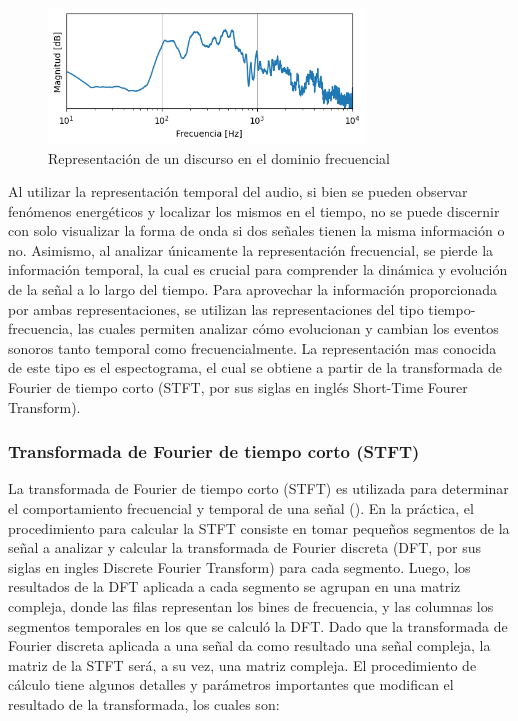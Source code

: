 \begin{figure}[h]
    \centering
    \includegraphics[width=0.75\textwidth]{figures/2.1.spectrum.png}
    \caption{Representación de un discurso en el dominio frecuencial}
    \label{fig:2.1. spectrum}
\end{figure}

Al utilizar la representación temporal del audio, si bien se pueden observar fenómenos energéticos y localizar los mismos en el tiempo, no se puede discernir con solo visualizar la forma de onda si dos señales tienen la misma información o no. Asimismo, al analizar únicamente la representación frecuencial, se pierde la información temporal, la cual es crucial para comprender la dinámica y evolución de la señal a lo largo del tiempo. Para aprovechar la información proporcionada por ambas representaciones, se utilizan las representaciones del tipo tiempo-frecuencia, las cuales permiten analizar cómo evolucionan y cambian los eventos sonoros tanto temporal como frecuencialmente. La representación mas conocida de este tipo es el espectograma, el cual se obtiene a partir de la transformada de Fourier de tiempo corto (STFT, por sus siglas en inglés Short-Time Fourer Transform).


\subsubsection{Transformada de Fourier de tiempo corto (STFT)}
La transformada de Fourier de tiempo corto (STFT) es utilizada para determinar el comportamiento frecuencial y temporal de una señal (\cite{sejdic2009}). En la práctica, el procedimiento para calcular la STFT consiste en tomar pequeños segmentos de la señal a analizar y calcular la transformada de Fourier discreta (DFT, por sus siglas en ingles Discrete Fourier Transform) para cada segmento. Luego, los resultados de la DFT aplicada a cada segmento se agrupan en una matriz compleja, donde las filas representan los bines de frecuencia, y las columnas los segmentos temporales en los que se calculó la DFT. Dado que la transformada de Fourier discreta aplicada a una señal da como resultado una señal compleja, la matriz de la STFT será, a su vez, una matriz compleja. El procedimiento de cálculo tiene algunos detalles y parámetros importantes que modifican el resultado de la transformada, los cuales son:


